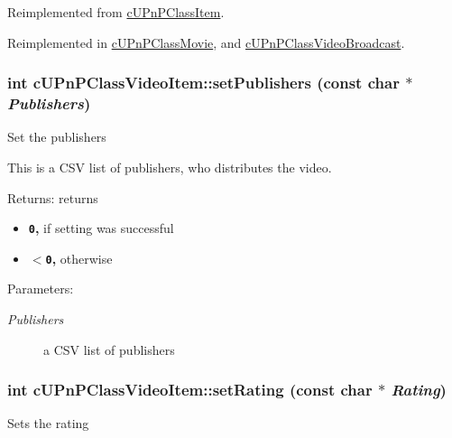 Reimplemented from \hyperlink{classcUPnPClassItem_ab17057659c17792a5b67f4297ade642}{cUPnPClassItem}.

Reimplemented in \hyperlink{classcUPnPClassMovie_d7f990edda85f2caabe822d2ceeb2b0d}{cUPnPClassMovie}, and \hyperlink{classcUPnPClassVideoBroadcast_ce7a341834e448479d3c8f4f0254ce43}{cUPnPClassVideoBroadcast}.\hypertarget{classcUPnPClassVideoItem_db14c0944a89f179832a4f4914caa4ca}{
\subsubsection[{setPublishers}]{\setlength{\rightskip}{0pt plus 5cm}int cUPnPClassVideoItem::setPublishers (const char $\ast$ {\em Publishers})}}
\label{classcUPnPClassVideoItem_db14c0944a89f179832a4f4914caa4ca}


Set the publishers

This is a CSV list of publishers, who distributes the video.

\begin{Desc}
\item[Returns:]returns\begin{itemize}
\item {\bf {\tt 0},} if setting was successful\item {\bf {\tt $<$0},} otherwise \end{itemize}
\end{Desc}
\begin{Desc}
\item[Parameters:]
\begin{description}
\item[{\em Publishers}]a CSV list of publishers \end{description}
\end{Desc}
\hypertarget{classcUPnPClassVideoItem_6d4143016fc91fcbb0db4e9f8a8a0047}{
\subsubsection[{setRating}]{\setlength{\rightskip}{0pt plus 5cm}int cUPnPClassVideoItem::setRating (const char $\ast$ {\em Rating})}}
\label{classcUPnPClassVideoItem_6d4143016fc91fcbb0db4e9f8a8a0047}


Sets the rating

